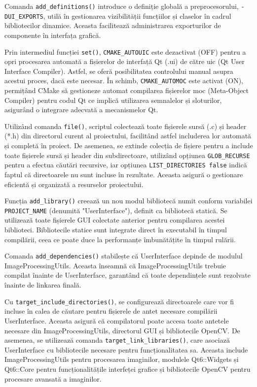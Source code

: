 \documentclass[a4paper,12pt]{report}
\begin{document}
Comanda \texttt{add\_definitions()} introduce o definiție globală a preprocesorului, \newline \texttt{-DUI\_EXPORTS}, utilă în gestionarea vizibilității funcțiilor și claselor în cadrul bibliotecilor dinamice. Aceasta facilitează administrarea exporturilor de componente în interfața grafică.

Prin intermediul funcției \texttt{set()}, \texttt{CMAKE\_AUTOUIC} este dezactivat (OFF) pentru a opri procesarea automată a fișierelor de interfață Qt (.ui) de către uic (Qt User Interface Compiler). Astfel, se oferă posibilitatea controlului manual asupra acestui proces, dacă este necesar. În schimb, \texttt{CMAKE\_AUTOMOC} este activat (ON), permițând CMake să gestioneze automat compilarea fișierelor moc (Meta-Object Compiler) pentru codul Qt ce implică utilizarea semnalelor și sloturilor, asigurând o integrare adecvată a mecanismelor Qt.

Utilizând comanda \texttt{file()}, scriptul colectează toate fișierele sursă (.c) și header (*.h) din directorul curent al proiectului, facilitând astfel includerea lor automată și completă în proiect. De asemenea, se extinde colecția de fișiere pentru a include toate fișierele sursă și header din subdirectoare, utilizând opțiunea \texttt{GLOB\_RECURSE} pentru a efectua căutări recursive, iar opțiunea \texttt{LIST\_DIRECTORIES false} indică faptul că directoarele nu sunt incluse în rezultate. Aceasta asigură o gestionare eficientă și organizată a resurselor proiectului.

Funcția \texttt{add\_library()} creează un nou modul bibliotecă numit conform variabilei \texttt{PROJECT\_NAME} (denumită "UserInterface"), definit ca bibliotecă statică. Se utilizează toate fișierele GUI colectate anterior pentru compilarea acestei biblioteci. Bibliotecile statice sunt integrate direct în executabil în timpul compilării, ceea ce poate duce la performanțe îmbunătățite în timpul rulării.

Comanda \texttt{add\_dependencies()} stabilește că UserInterface depinde de modulul ImageProcessingUtils. Aceasta înseamnă că ImageProcessingUtils trebuie compilat înainte de UserInterface, garantând că toate dependințele sunt rezolvate înainte de linkarea finală.

Cu \texttt{target\_include\_directories()}, se configurează directoarele care vor fi incluse în calea de căutare pentru fișierele de antet necesare compilării UserInterface. Aceasta asigură că compilatorul poate accesa toate antetele necesare din ImageProcessingUtils, directorul GUI și bibliotecile OpenCV. De asemenea, se utilizează comanda \texttt{target\_link\_libraries()}, care asociază UserInterface cu bibliotecile necesare pentru funcționalitatea sa. Aceasta include ImageProcessingUtils pentru procesarea imaginilor, modulele Qt6::Widgets și Qt6::Core pentru funcționalitățile interfeței grafice și bibliotecile OpenCV pentru procesare avansată a imaginilor.
\end{document}
